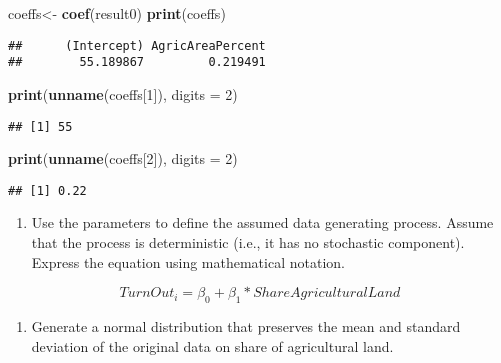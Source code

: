 \documentclass[
]{book}
\newenvironment{Shaded}{\begin{snugshade}}{\end{snugshade}}
\newcommand{\AttributeTok}[1]{\textcolor[rgb]{0.13,0.29,0.53}{#1}}
\newcommand{\DecValTok}[1]{\textcolor[rgb]{0.00,0.00,0.81}{#1}}
\newcommand{\FunctionTok}[1]{\textcolor[rgb]{0.13,0.29,0.53}{\textbf{#1}}}
\newcommand{\NormalTok}[1]{#1}
\newcommand{\OtherTok}[1]{\textcolor[rgb]{0.56,0.35,0.01}{#1}}
\providecommand{\tightlist}{%
  \setlength{\itemsep}{0pt}\setlength{\parskip}{0pt}}
\begin{document}
\begin{Shaded}
\begin{Highlighting}[]
\NormalTok{coeffs}\OtherTok{\textless{}{-}} \FunctionTok{coef}\NormalTok{(result0)}
\FunctionTok{print}\NormalTok{(coeffs)}
\end{Highlighting}
\end{Shaded}

\begin{verbatim}
##      (Intercept) AgricAreaPercent 
##        55.189867         0.219491
\end{verbatim}

\begin{Shaded}
\begin{Highlighting}[]
\FunctionTok{print}\NormalTok{(}\FunctionTok{unname}\NormalTok{(coeffs[}\DecValTok{1}\NormalTok{]), }\AttributeTok{digits =} \DecValTok{2}\NormalTok{)}
\end{Highlighting}
\end{Shaded}

\begin{verbatim}
## [1] 55
\end{verbatim}

\begin{Shaded}
\begin{Highlighting}[]
\FunctionTok{print}\NormalTok{(}\FunctionTok{unname}\NormalTok{(coeffs[}\DecValTok{2}\NormalTok{]), }\AttributeTok{digits =} \DecValTok{2}\NormalTok{)}
\end{Highlighting}
\end{Shaded}

\begin{verbatim}
## [1] 0.22
\end{verbatim}

\begin{enumerate}
\def\labelenumi{\roman{enumi}.}
\setcounter{enumi}{1}
\tightlist
\item
  Use the parameters to define the assumed data generating process. Assume that the process is deterministic (i.e., it has no stochastic component). Express the equation using mathematical notation.
\end{enumerate}

\[TurnOut_i = \beta_0 + \beta_1 * ShareAgriculturalLand\]

\begin{enumerate}
\def\labelenumi{\roman{enumi}.}
\setcounter{enumi}{2}
\tightlist
\item
  Generate a normal distribution that preserves the mean and standard deviation of the original data on share of agricultural land.
\end{enumerate}
\end{document}
